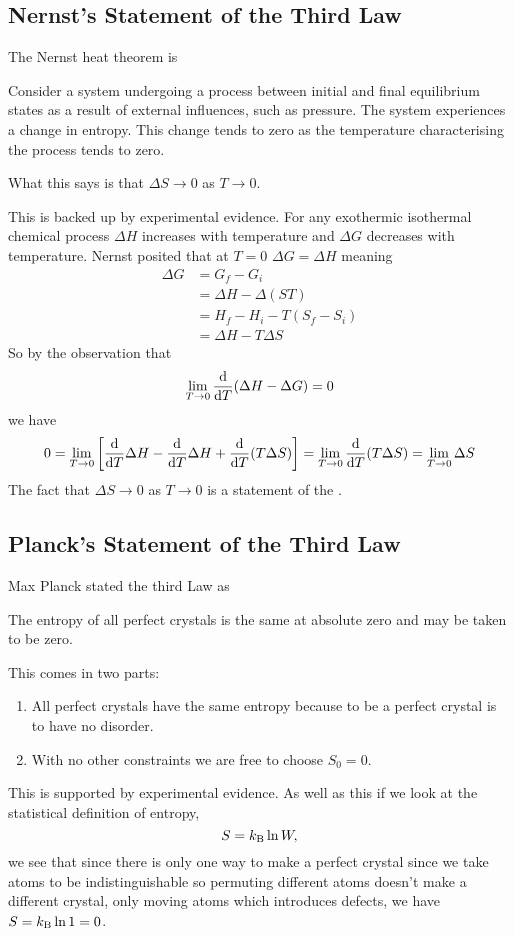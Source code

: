     \subsection{Nernst's Statement of the Third Law}
    The Nernst heat theorem is
    \begin{displayquote}[--W. Nernst]
        Consider a system undergoing a process between initial and final equilibrium states as a result of external influences, such as pressure.
        The system experiences a change in entropy.
        This change tends to zero as the temperature characterising the process tends to zero.
    \end{displayquote}
    What this says is that \(\Delta S \to 0\) as \(T \to 0\).
    
    This is backed up by experimental evidence.
    For any exothermic isothermal chemical process \(\Delta H\) increases with temperature and \(\Delta G\) decreases with temperature.
    Nernst posited that at \(T = 0\) \(\Delta G = \Delta H\) meaning
    \begin{align*}
        \Delta G &= G_f - G_i\\
        &= \Delta H - \Delta(ST)\\
        &= H_f - H_i - T(S_f - S_i)\\
        &= \Delta H - T\Delta S
    \end{align*}
    So by the observation that
    \[\lim_{T\to 0} \dv{T}(\Delta H - \Delta G) = 0\]
    we have
    \[0 = \lim_{T\to 0}\left[\dv{T}\Delta H - \dv{T} \Delta H + \dv{T}(T\Delta S)\right] = \lim_{T\to 0}\dv{T}(T\Delta S) = \lim_{T\to 0}\Delta S\]
    The fact that \(\Delta S\to 0\) as \(T\to 0\) is a statement of the .
    
    \subsection{Planck's Statement of the Third Law}
    Max Planck stated the third Law as
    \begin{displayquote}[--M. Planck]
        The entropy of all perfect crystals is the same at absolute zero and may be taken to be zero.
    \end{displayquote}
    This comes in two parts:
    \begin{enumerate}
        \item All perfect crystals have the same entropy because to be a perfect crystal is to have no disorder.
        \item With no other constraints we are free to choose \(S_0 = 0\).
    \end{enumerate}
    This is supported by experimental evidence.
    As well as this if we look at the statistical definition of entropy,
    \[S = k_\mathrm{B}\ln W,\]
    we see that since there is only one way to make a perfect crystal since we take atoms to be indistinguishable so permuting different atoms doesn't make a different crystal, only moving atoms which introduces defects, we have \(S = k_\mathrm{B}\ln 1 = 0\).
    
